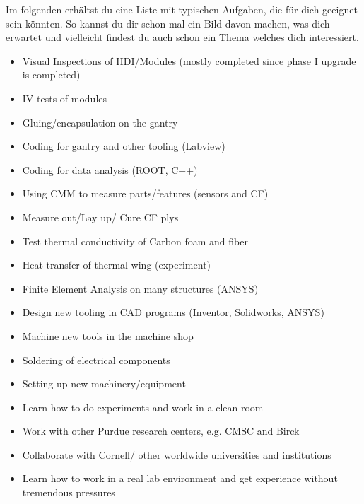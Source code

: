 \documentclass[
  paper=a4,
  fontsize=12pt,
  DIV=16,
  headheight=52pt,
  footheight=45pt,
  headinclude,
  parskip=full,
]{scrartcl}
\begin{document}
Im folgenden erhältst du eine Liste mit typischen Aufgaben, die für dich geeignet sein könnten.
So kannst du dir schon mal ein Bild davon machen, was dich erwartet und vielleicht findest du auch schon ein Thema welches dich interessiert.
\begin{itemize}
  \item Visual Inspections of HDI/Modules (mostly completed since phase I
  upgrade is completed)
  \item IV tests of modules
  \item Gluing/encapsulation on the gantry
  \item Coding for gantry and other tooling (Labview)
  \item Coding for data analysis (ROOT, C++)
  \item Using CMM to measure parts/features (sensors and CF)
  \item Measure out/Lay up/ Cure CF plys
  \item Test thermal conductivity of Carbon foam and fiber
  \item Heat transfer of thermal wing (experiment)
  \item Finite Element Analysis on many structures (ANSYS)
  \item Design new tooling in CAD programs (Inventor, Solidworks, ANSYS)
  \item Machine new tools in the machine shop
  \item Soldering of electrical components
  \item Setting up new machinery/equipment
  \item Learn how to do experiments and work in a clean room
  \item Work with other Purdue research centers, e.g. CMSC and Birck
  \item Collaborate with Cornell/ other worldwide universities and institutions
  \item Learn how to work in a real lab environment and get experience without
  tremendous pressures
\end{itemize}
\end{document}
